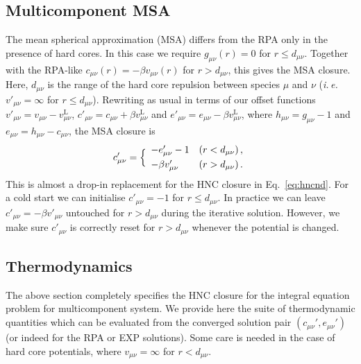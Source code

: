 \documentclass[12pt,a4paper]{article}
\newcommand{\latin}[1]{\emph{#1}}
\newcommand{\ie}{\latin{i.\,e.}}
\newcommand{\lr}{^{\mathrm{L}}}
\newcommand{\Eqref}[1]{Eq.~\eqref{#1}}
\begin{document}
\subsection{Multicomponent MSA}
%
The mean spherical approximation (MSA) differs from the RPA only in
the presence of hard cores.  In this case we require $g_{\mu\nu}(r)=0$
for $r\le d_{\mu\nu}$.  Together with the RPA-like $c_{\mu\nu}(r)=
-\beta v_{\mu\nu}(r)$ for $r> d_{\mu\nu}$, this gives the MSA closure.
Here, $d_{\mu\nu}$ is the range of the hard core repulsion between
species $\mu$ and $\nu$ (\ie\ $v'_{\mu\nu}=\infty$ for $r\le
d_{\mu\nu}$).  Rewriting as usual in terms of our offset functions
$v'_{\mu\nu}=v_{\mu\nu}-v\lr_{\mu\nu}$, $c'_{\mu\nu}=c_{\mu\nu}+\beta
v\lr_{\mu\nu}$ and $e'_{\mu\nu}=e_{\mu\nu}-\beta v\lr_{\mu\nu}$, where
$h_{\mu\nu}=g_{\mu\nu}-1$ and $e_{\mu\nu}=h_{\mu\nu}-c_{\mu\nu}$, the
MSA closure is
%
\begin{equation}
  c'_{\mu\nu}=\Bigl\{\begin{array}{ll}
  -e'_{\mu\nu}-1 & (r<d_{\mu\nu})\,,\\[3pt]
  -\beta v'_{\mu\nu} & (r>d_{\mu\nu})\,.
  \end{array}
\end{equation}
%
This is almost a drop-in replacement for the HNC closure in
\Eqref{eq:hncnd}.  For a cold start we can initialise $c'_{\mu\nu}=-1$
for $r\le d_{\mu\nu}$.  In practice we can leave $c'_{\mu\nu}=-\beta
v'_{\mu\nu}$ untouched for $r>d_{\mu\nu}$ during the iterative
solution.  However, we make sure $c'_{\mu\nu}$ is correctly reset for
$r>d_{\mu\nu}$ whenever the potential is changed.
  
\subsection{Thermodynamics}
\label{sec:thermo}
%
The above section completely specifies the HNC closure for the
integral equation problem for multicomponent system.  We provide here
the suite of thermodynamic quantities which can be evaluated from the
converged solution pair $(c_{\mu\nu}', e_{\mu\nu}')$ (or indeed for
the RPA or EXP solutions).  Some care is needed in the case of hard
core potentials, where $v_{\mu\nu}=\infty$ for $r<d_{\mu\nu}$.
\end{document}
